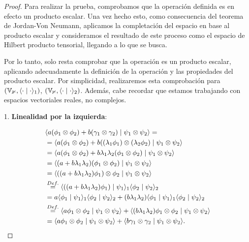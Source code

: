 \begin{proof}
    Para realizar la prueba, comprobamos que la operación definida es en efecto un producto escalar. Una vez hecho esto, como consecuencia del teorema de Jordan-Von Neumann, aplicamos la completación del espacio en base al producto escalar y consideramos el resultado de este proceso como el espacio de Hilbert producto tensorial, llegando a lo que se busca.

    Por lo tanto, solo resta comprobar que la operación es un producto escalar, aplicando adecuadamente la definición de la operación y las propiedades del producto escalar. Por simplicidad, realizaremos esta comprobación para $(\mathbb{V_1}, \innerproduct{\cdot}{\cdot}_1)$, $(\mathbb{V_2}, \innerproduct{\cdot}{\cdot}_2)$. Además, cabe recordar que estamos trabajando con espacios vectoriales reales, no complejos.

    1. \textbf{Linealidad por la izquierda}:

    \begin{equation}
    \begin{split}
        &\innerproduct{a(\phi_1 \otimes \phi_2) + b(\gamma_1 \otimes \gamma_2)}{\psi_1 \otimes \psi_2} = \\
        &= \innerproduct{a(\phi_1 \otimes \phi_2) + b((\lambda_1 \phi_1) \otimes (\lambda_2 \phi_2)}{\psi_1 \otimes \psi_2} \\
        &= \innerproduct{a(\phi_1 \otimes \phi_2) + b \lambda_1 \lambda_2 (\phi_1 \otimes \phi_2)}{\psi_1 \otimes \psi_2} \\
        &= \innerproduct{(a + b \lambda_1 \lambda_2) (\phi_1 \otimes \phi_2)}{\psi_1 \otimes \psi_2} \\
        &= \innerproduct{((a + b \lambda_1 \lambda_2) \phi_1) \otimes \phi_2}{\psi_1 \otimes \psi_2} \\
        &\encima{=}{Def.} \innerproduct{((a + b \lambda_1 \lambda_2) \phi_1)}{\psi_1}_1 \innerproduct{\phi_2}{\psi_2}_2 \\
        &= a \innerproduct{\phi_1}{\psi_1}_1 \innerproduct{\phi_2}{\psi_2}_2 + (b \lambda_1 \lambda_2) \innerproduct{\phi_1}{\psi_1}_1 \innerproduct{\phi_2}{\psi_2}_2 \\
        &\encima{=}{Def.} \innerproduct{a \phi_1 \otimes \phi_2}{\psi_1 \otimes \psi_2} + \innerproduct{(b \lambda_1 \lambda_2) \phi_1 \otimes \phi_2}{\psi_1 \otimes \psi_2} \\
        &= \innerproduct{a \phi_1 \otimes \phi_2}{\psi_1 \otimes \psi_2} + \innerproduct{b \gamma_1 \otimes \gamma_2}{\psi_1 \otimes \psi_2}.
    \end{split}
    \end{equation}


\end{proof}
